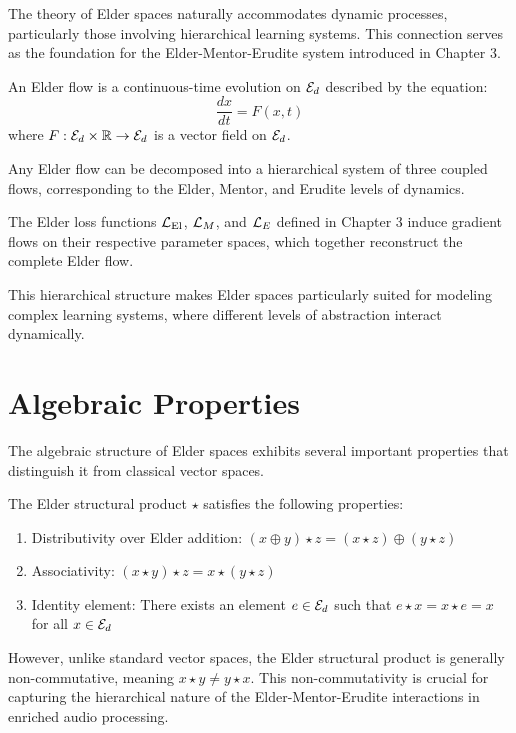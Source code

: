 The theory of Elder spaces naturally accommodates dynamic processes, particularly those involving hierarchical learning systems. This connection serves as the foundation for the Elder-Mentor-Erudite system introduced in Chapter 3.

\begin{definition}
An Elder flow is a continuous-time evolution on $\mathcal{E}_{d}$ described by the equation:
\begin{equation}
\frac{dx}{dt} = F(x, t)
\end{equation}
where $F: \mathcal{E}_{d} \times \mathbb{R} \rightarrow \mathcal{E}_{d}$ is a vector field on $\mathcal{E}_{d}$.
\end{definition}

\begin{theorem}
Any Elder flow can be decomposed into a hierarchical system of three coupled flows, corresponding to the Elder, Mentor, and Erudite levels of dynamics.
\end{theorem}

\begin{corollary}
The Elder loss functions $\mathcal{L}_{\text{El}}$, $\mathcal{L}_M$, and $\mathcal{L}_E$ defined in Chapter 3 induce gradient flows on their respective parameter spaces, which together reconstruct the complete Elder flow.
\end{corollary}

This hierarchical structure makes Elder spaces particularly suited for modeling complex learning systems, where different levels of abstraction interact dynamically.

\section{Algebraic Properties}

The algebraic structure of Elder spaces exhibits several important properties that distinguish it from classical vector spaces.

\begin{proposition}
The Elder structural product $\star$ satisfies the following properties:
\begin{enumerate}
    \item Distributivity over Elder addition: $(x \oplus y) \star z = (x \star z) \oplus (y \star z)$
    \item Associativity: $(x \star y) \star z = x \star (y \star z)$
    \item Identity element: There exists an element $e \in \mathcal{E}_{d}$ such that $e \star x = x \star e = x$ for all $x \in \mathcal{E}_{d}$
\end{enumerate}
\end{proposition}

However, unlike standard vector spaces, the Elder structural product is generally non-commutative, meaning $x \star y \neq y \star x$. This non-commutativity is crucial for capturing the hierarchical nature of the Elder-Mentor-Erudite interactions in enriched audio processing.